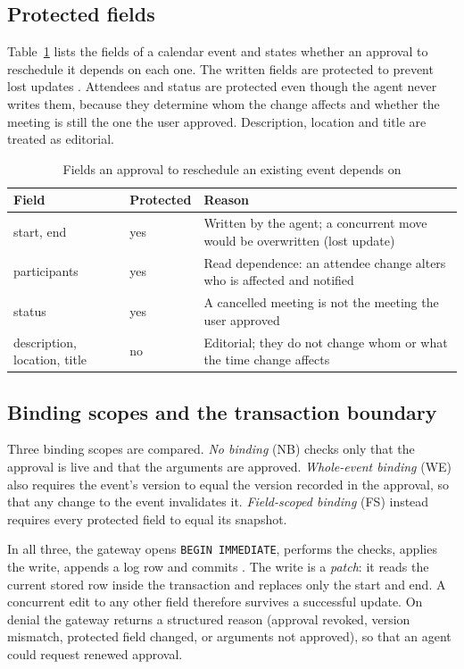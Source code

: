 \subsection{Protected fields}
Table~\ref{tab:fields} lists the fields of a calendar event and states whether an approval to reschedule it depends on each one. The written fields are protected to prevent lost updates \cite{berenson1995}. Attendees and status are protected even though the agent never writes them, because they determine whom the change affects and whether the meeting is still the one the user approved. Description, location and title are treated as editorial.

\begin{table}[t]
\caption{Fields an approval to reschedule an existing event depends on}
\label{tab:fields}
\centering
\footnotesize
\begin{tabular}{p{1.9cm}p{1.15cm}p{4.0cm}}
\toprule
Field & Protected & Reason \\
\midrule
start, end & yes & Written by the agent; a concurrent move would be overwritten (lost update) \\
participants & yes & Read dependence: an attendee change alters who is affected and notified \\
status & yes & A cancelled meeting is not the meeting the user approved \\
description, location, title & no & Editorial; they do not change whom or what the time change affects \\
\bottomrule
\end{tabular}
\end{table}

\subsection{Binding scopes and the transaction boundary}
Three binding scopes are compared. \emph{No binding} (NB) checks only that the approval is live and that the arguments are approved. \emph{Whole-event binding} (WE) also requires the event's version to equal the version recorded in the approval, so that any change to the event invalidates it. \emph{Field-scoped binding} (FS) instead requires every protected field to equal its snapshot.

In all three, the gateway opens \texttt{BEGIN IMMEDIATE}, performs the checks, applies the write, appends a log row and commits \cite{sqlitetxn}. The write is a \emph{patch}: it reads the current stored row inside the transaction and replaces only the start and end. A concurrent edit to any other field therefore survives a successful update. On denial the gateway returns a structured reason (approval revoked, version mismatch, protected field changed, or arguments not approved), so that an agent could request renewed approval.

